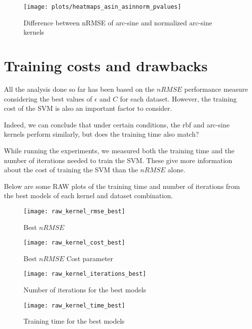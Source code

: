 \begin{figure}[H]
    \texttt{[image: plots/heatmaps\_asin\_asinnorm\_pvalues]}
    \caption{Difference between nRMSE of arc-sine and normalized arc-sine kernels}
    \label{fig:heatmaps-asin-asinnorm}
\end{figure}

\section{Training costs and drawbacks}

All the analysis done so far has been based on the $nRMSE$ performance measure
considering the best values of $\epsilon$ and $C$ for each dataset. However,
the training cost of the SVM is also an important factor to consider.

Indeed, we can conclude that under certain conditions, the rbf and arc-sine
kernels perform similarly, but does the training time also match?

While running the experiments, we measured both the training time and the
number of iterations needed to train the SVM. These give more information
about the cost of training the SVM than the $nRMSE$ alone.

\begin{cnote}
    Below are some RAW plots of the training time and number of iterations
    from the best models of each kernel and dataset combination.
\end{cnote}
\begin{figure}[H]
    \texttt{[image: raw\_kernel\_rmse\_best]}
    \caption{Best $nRMSE$}
\end{figure}
\begin{figure}[H]
    \texttt{[image: raw\_kernel\_cost\_best]}
    \caption{Best $nRMSE$ Cost parameter}
\end{figure}
\begin{figure}[H]
    \texttt{[image: raw\_kernel\_iterations\_best]}
    \caption{Number of iterations for the best models}
\end{figure}
\begin{figure}[H]
    \texttt{[image: raw\_kernel\_time\_best]}
    \caption{Training time for the best models}
\end{figure}


%
%
%

